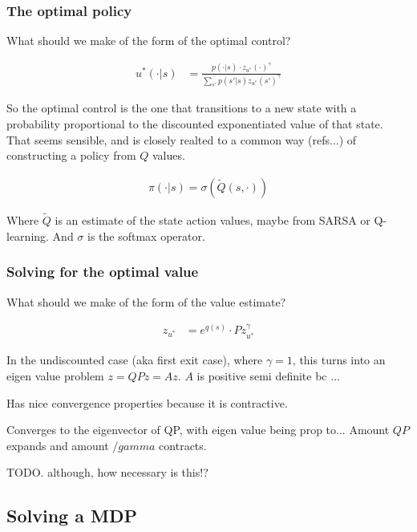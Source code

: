\subsubsection{The optimal policy}

What should we make of the form of the optimal control?

\begin{align*}
u^{* }(\cdot | s) &= \frac{p(\cdot | s)\cdot z_{u^{* }}(\cdot)^{\gamma}}{\sum_{s'} p(s' | s) z_{u^{* }}(s')^{\gamma}}
\end{align*}

So the optimal control is the one that transitions to a new state with a
probability proportional to the discounted exponentiated value of that state.
That seems sensible, and is closely realted to a common way (refs...) of constructing a policy from $Q$ values.

\begin{align*}
\pi(\cdot|s) = \sigma(\tilde Q(s, \cdot))
\end{align*}

Where $\tilde Q$ is an estimate of the state action values, maybe from SARSA or Q-learning.
And $\sigma$ is the softmax operator.

\subsubsection{Solving for the optimal value}

What should we make of the form of the value estimate?

\begin{align*}
z_{u^{* }} &= e^{q(s)}\cdot P z_{u^{* }}^{\gamma}
\end{align*}

In the undiscounted case (aka first exit case), where $\gamma=1$, this turns
into an eigen value problem $z = QPz = Az$.
$A$ is positive semi definite bc ...

Has nice convergence properties because it is contractive.

Converges to the eigenvector of QP, with eigen value being prop to...
Amount $QP$ expands and amount $/gamma$ contracts.

{\color{red}TODO. although, how necessary is this!?}

\subsection{Solving a MDP}

